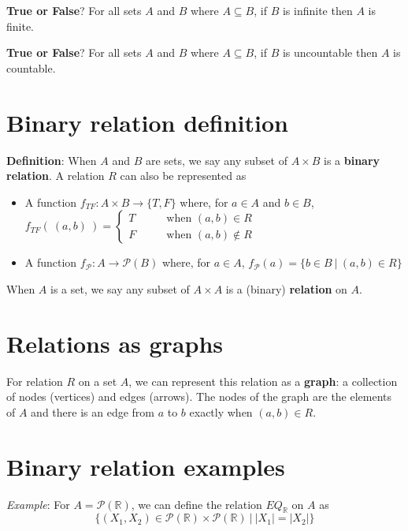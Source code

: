 \documentclass[12pt, oneside]{article}
\begin{document}
{\bf True or False}?   For all sets $A$ and $B$ where  $A \subseteq B$, 
if $B$ is infinite then $A$ is finite.

\vfill

{\bf True or False}?   For all sets $A$ and $B$ where  $A \subseteq B$, 
if $B$ is uncountable then $A$ is countable.

\vfill \vfill
\section*{Binary relation definition}


{\bf Definition}: When $A$ and $B$ are sets, we say any subset of $A \times B$ is a {\bf binary relation}. 
A relation $R$ can also be represented as

\begin{itemize}
\item A function $f_{TF} : A \times B \to \{T, F\}$
where, for $a \in A$ and $b \in B$, $f_{TF}(~(a,b)~) = 
\begin{cases} 
    T \qquad&\text{when } (a,b) \in R \\
    F \qquad&\text{when } (a,b) \notin R
\end{cases}$
\item A function $f_{\mathcal{P}} : A   \to \mathcal{P}(B)$ where, for $a \in A$, 
$f_{\mathcal{P}}( a ) = \{ b \in B ~|~ (a,b) \in R \}$
\end{itemize}

When $A$ is a set, we say any subset of $A \times A$ is a (binary) {\bf relation} on $A$.

 \vfill
\section*{Relations as graphs}


For relation $R$ on a set $A$, we can represent this relation as a
{\bf graph}: a collection of nodes (vertices) and edges (arrows). The 
nodes of the graph are the elements of $A$ and 
there is an edge from $a$ to $b$ exactly when $(a,b) \in R$.
 \vfill
\section*{Binary relation examples}


{\it Example}: For $A = \mathcal{P}(\mathbb{R})$, we can define the relation $EQ_{\mathbb{R}}$ on $A$ as 
\[
\{ (X_1, X_2 ) \in\mathcal{P}(\mathbb{R})  \times \mathcal{P}(\mathbb{R}) ~|~ |X_1| = |X_2| \}
\]
\end{document}
